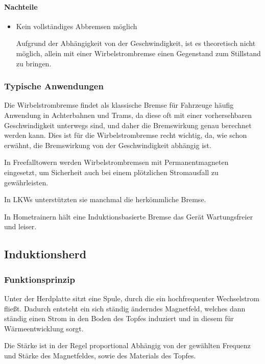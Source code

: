 \paragraph{Nachteile}

\begin{itemize}

	\item Kein vollständiges Abbremsen möglich
	
Aufgrund der Abhängigkeit von der Geschwindigkeit, ist es theoretisch nicht möglich, allein mit einer Wirbelstrombremse einen Gegenstand zum Stillstand zu bringen.

\end{itemize}


\subsubsection{Typische Anwendungen}

Die Wirbelstrombremse findet als klassische Bremse für Fahrzeuge häufig Anwendung in Achterbahnen und Trams, da diese oft mit einer vorhersehbaren Geschwindigkeit unterwegs sind, und daher die Bremswirkung genau berechnet werden kann. Dies ist für die Wirbelstrombremse recht wichtig, da, wie schon erwähnt, die Bremswirkung von der Geschwindigkeit abhängig ist.

In Freefalltowern werden Wirbelstrombremsen mit Permanentmagneten eingesetzt, um Sicherheit auch bei einem plötzlichen Stromausfall zu gewährleisten.

In LKWs unterstützten sie manchmal die herkömmliche Bremse.

In Hometrainern hält eine Induktionsbasierte Bremse das Gerät Wartungsfreier und leiser.


\subsection{Induktionsherd}

\subsubsection{Funktionsprinzip}

Unter der Herdplatte sitzt eine Spule, durch die ein hochfrequenter Wechselstrom fließt. Dadurch entsteht ein sich ständig änderndes Magnetfeld, welches dann ständig einen Strom in den Boden des Topfes induziert und in diesem für Wärmeentwicklung sorgt.

Die Stärke ist in der Regel proportional Abhängig von der gewählten Frequenz und Stärke des Magnetfeldes, sowie des Materials des Topfes.


